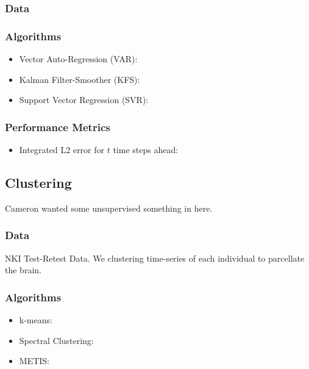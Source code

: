 \subsubsection{Data}

\subsubsection{Algorithms}

\begin{itemize} \itemsep0pt
	\item Vector Auto-Regression (VAR):
	\item Kalman Filter-Smoother (KFS):
	\item Support Vector Regression (SVR): 
\end{itemize}

\subsubsection{Performance Metrics}

\begin{itemize} \itemsep0pt
	\item Integrated L2 error for $t$ time steps ahead: 
\end{itemize}



\subsection{Clustering}

Cameron wanted some unsupervised something in here.

\subsubsection{Data}

NKI Test-Retest Data.  We clustering time-series of each individual to parcellate the brain.

\subsubsection{Algorithms}

\begin{itemize} \itemsep0pt
	\item k-means:
	\item Spectral Clustering:
	\item METIS: 
\end{itemize}

